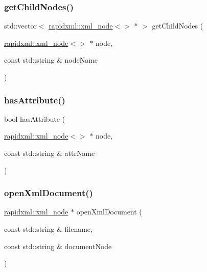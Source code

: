 \mbox{\label{namespacexmlutils_aae534755778e439dfab1aa1856e27002}} 
\subsubsection{\texorpdfstring{get\+Child\+Nodes()}{getChildNodes()}}
{\footnotesize\ttfamily std\+::vector$<$ \mbox{\hyperlink{classrapidxml_1_1xml__node}{rapidxml\+::xml\+\_\+node}}$<$$>$ $\ast$ $>$ get\+Child\+Nodes (\begin{DoxyParamCaption}\item[{\mbox{\hyperlink{classrapidxml_1_1xml__node}{rapidxml\+::xml\+\_\+node}}$<$$>$ $\ast$}]{node,  }\item[{const std\+::string \&}]{node\+Name }\end{DoxyParamCaption})}

\mbox{\label{namespacexmlutils_ae8f64d4332fabd1d2a4b2f623522003b}} 
\subsubsection{\texorpdfstring{has\+Attribute()}{hasAttribute()}}
{\footnotesize\ttfamily bool has\+Attribute (\begin{DoxyParamCaption}\item[{\mbox{\hyperlink{classrapidxml_1_1xml__node}{rapidxml\+::xml\+\_\+node}}$<$$>$ $\ast$}]{node,  }\item[{const std\+::string \&}]{attr\+Name }\end{DoxyParamCaption})}

\mbox{\label{namespacexmlutils_a8b4e27a7832af00345b3c4909a09f5b7}} 
\subsubsection{\texorpdfstring{open\+Xml\+Document()}{openXmlDocument()}}
{\footnotesize\ttfamily \mbox{\hyperlink{classrapidxml_1_1xml__node}{rapidxml\+::xml\+\_\+node}} $\ast$ open\+Xml\+Document (\begin{DoxyParamCaption}\item[{const std\+::string \&}]{filename,  }\item[{const std\+::string \&}]{document\+Node }\end{DoxyParamCaption})}

